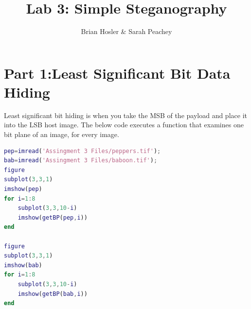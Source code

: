 \documentclass{article}
\begin{document}
\title{Lab 3: Simple Steganography}
\author{Brian Hosler \& Sarah Peachey }
\maketitle 

\tableofcontents
\newpage


\section{Part 1:Least Significant Bit Data Hiding}

Least significant bit hiding is when you take the MSB of the payload and
place it into the LSB host image. The below code executes a function that
examines one bit plane of an image, for every image. 

\begin{lstlisting}[language=Matlab]
pep=imread('Assingment 3 Files/peppers.tif');
bab=imread('Assingment 3 Files/baboon.tif');
figure
subplot(3,3,1)
imshow(pep)
for i=1:8
    subplot(3,3,10-i)
    imshow(getBP(pep,i))
end

figure
subplot(3,3,1)
imshow(bab)
for i=1:8
    subplot(3,3,10-i)
    imshow(getBP(bab,i))
end
\end{lstlisting}
\end{document}
